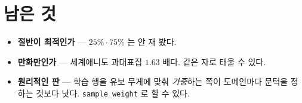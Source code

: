 \documentclass[11pt]{article}
\begin{document}
\section*{남은 것}

\begin{itemize}
\item \textbf{절반이 최적인가} --- $25\% \cdot 75\%$ 는 안 재 봤다.
\item \textbf{만화만인가} --- 세계애니도 과대표집 $1.63$ 배다. 같은 자로
태울 수 있다.
\item \textbf{원리적인 판} --- 학습 행을 유보 무게에 맞춰 \emph{가중}하는
쪽이 도메인마다 문턱을 정하는 것보다 낫다. \texttt{sample\_weight} 로
할 수 있다.
\end{itemize}
\end{document}

